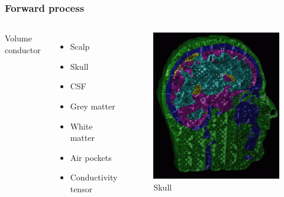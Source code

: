 \documentclass{beamer}
\begin{document}
\begin{frame}
    \frametitle{Forward process}
    \begin{columns}
        Volume conductor
        \begin{itemize}
            \item Scalp
            \item Skull
            \item CSF
            \item Grey matter
            \item White matter
            \item Air pockets
            \item Conductivity tensor
        \end{itemize}

        \begin{figure}[H]
            \centering
            \includegraphics[height=0.5\textheight]{skull.png}
            \caption{Skull}
            \label{fig:Skull}
        \end{figure}

    \end{columns}
\end{frame}
\end{document}
